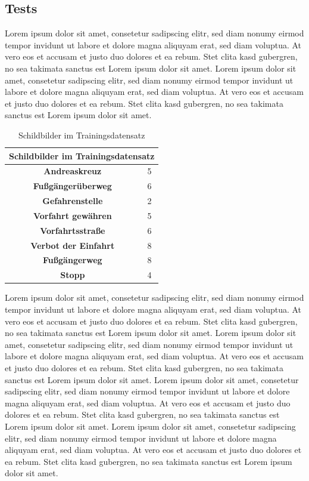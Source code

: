 \documentclass[paper=A4,pagesize=auto,12pt,headinclude=true,footinclude=true,BCOR=0mm,DIV=calc]{scrartcl}
\begin{document}
\subsection{Tests}
Lorem ipsum dolor sit amet, consetetur sadipscing elitr, sed diam nonumy eirmod tempor invidunt ut labore et dolore magna aliquyam erat, sed diam voluptua. At vero eos et accusam et justo duo dolores et ea rebum. Stet clita kasd gubergren, no sea takimata sanctus est Lorem ipsum dolor sit amet. Lorem ipsum dolor sit amet, consetetur sadipscing elitr, sed diam nonumy eirmod tempor invidunt ut labore et dolore magna aliquyam erat, sed diam voluptua. At vero eos et accusam et justo duo dolores et ea rebum. Stet clita kasd gubergren, no sea takimata sanctus est Lorem ipsum dolor sit amet.
\begin{table} %
	\centering
	\begin{tabular}{|c|c|}
		\hline
		\multicolumn{2}{|c|}{\textbf{Schildbilder im Trainingsdatensatz}}\\ \hline \hline
		\textbf{Andreaskreuz} & 5 \\ \hline
		\textbf{Fußgängerüberweg} & 6 \\ \hline
		\textbf{Gefahrenstelle} & 2 \\ \hline
		\textbf{Vorfahrt gewähren} & 5 \\ \hline
		\textbf{Vorfahrtsstraße} & 6 \\ \hline
		\textbf{Verbot der Einfahrt} & 8 \\ \hline
		\textbf{Fußgängerweg} & 8 \\ \hline
		\textbf{Stopp} & 4 \\ \hline
	\end{tabular}
	\caption{Schildbilder im Trainingsdatensatz}
	\label{trainData}
\end{table}
Lorem ipsum dolor sit amet, consetetur sadipscing elitr, sed diam nonumy eirmod tempor invidunt ut labore et dolore magna aliquyam erat, sed diam voluptua. At vero eos et accusam et justo duo dolores et ea rebum. Stet clita kasd gubergren, no sea takimata sanctus est Lorem ipsum dolor sit amet. Lorem ipsum dolor sit amet, consetetur sadipscing elitr, sed diam nonumy eirmod tempor invidunt ut labore et dolore magna aliquyam erat, sed diam voluptua. At vero eos et accusam et justo duo dolores et ea rebum. Stet clita kasd gubergren, no sea takimata sanctus est Lorem ipsum dolor sit amet. Lorem ipsum dolor sit amet, consetetur sadipscing elitr, sed diam nonumy eirmod tempor invidunt ut labore et dolore magna aliquyam erat, sed diam voluptua. At vero eos et accusam et justo duo dolores et ea rebum. Stet clita kasd gubergren, no sea takimata sanctus est Lorem ipsum dolor sit amet. Lorem ipsum dolor sit amet, consetetur sadipscing elitr, sed diam nonumy eirmod tempor invidunt ut labore et dolore magna aliquyam erat, sed diam voluptua. At vero eos et accusam et justo duo dolores et ea rebum. Stet clita kasd gubergren, no sea takimata sanctus est Lorem ipsum dolor sit amet.
\end{document}
